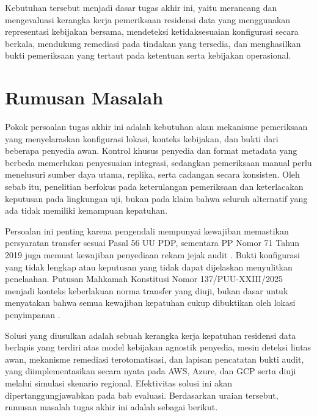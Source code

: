 Kebutuhan tersebut menjadi dasar tugas akhir ini, yaitu merancang dan mengevaluasi kerangka kerja pemeriksaan residensi data yang menggunakan representasi kebijakan bersama, mendeteksi ketidaksesuaian konfigurasi secara berkala, mendukung remediasi pada tindakan yang tersedia, dan menghasilkan bukti pemeriksaan yang tertaut pada ketentuan serta kebijakan operasional.


\section{Rumusan Masalah}

Pokok persoalan tugas akhir ini adalah kebutuhan akan mekanisme pemeriksaan yang menyelaraskan konfigurasi lokasi, konteks kebijakan, dan bukti dari beberapa penyedia awan. Kontrol khusus penyedia dan format metadata yang berbeda memerlukan penyesuaian integrasi, sedangkan pemeriksaan manual perlu menelusuri sumber daya utama, replika, serta cadangan secara konsisten. Oleh sebab itu, penelitian berfokus pada keterulangan pemeriksaan dan keterlacakan keputusan pada lingkungan uji, bukan pada klaim bahwa seluruh alternatif yang ada tidak memiliki kemampuan kepatuhan.

Persoalan ini penting karena pengendali mempunyai kewajiban memastikan persyaratan transfer sesuai Pasal 56 UU PDP, sementara PP Nomor 71 Tahun 2019 juga memuat kewajiban penyediaan rekam jejak audit \autocite[Pasal 56]{uupdp2022}\autocite[Pasal 22]{pp712019}. Bukti konfigurasi yang tidak lengkap atau keputusan yang tidak dapat dijelaskan menyulitkan penelaahan. Putusan Mahkamah Konstitusi Nomor 137/PUU-XXIII/2025 menjadi konteks keberlakuan norma transfer yang diuji, bukan dasar untuk menyatakan bahwa semua kewajiban kepatuhan cukup dibuktikan oleh lokasi penyimpanan \autocite{mk2026}.

Solusi yang diusulkan adalah sebuah kerangka kerja kepatuhan residensi data berlapis yang terdiri atas model kebijakan agnostik penyedia, mesin deteksi lintas awan, mekanisme remediasi terotomatisasi, dan lapisan pencatatan bukti audit, yang diimplementasikan secara nyata pada AWS, Azure, dan GCP serta diuji melalui simulasi skenario regional. Efektivitas solusi ini akan dipertanggungjawabkan pada bab evaluasi. Berdasarkan uraian tersebut, rumusan masalah tugas akhir ini adalah sebagai berikut.

